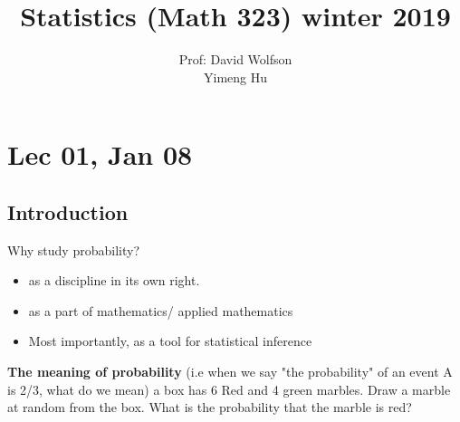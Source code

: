 \documentclass[11pt]{article}
\newcommand\tab[1][1cm]{\hspace*{#1}}
\begin{document}
\author{Prof: David Wolfson \\Yimeng Hu }
\title{Statistics (Math 323) winter 2019}
\date{}
\maketitle
\tableofcontents
\newpage
    \section{Lec 01, Jan 08}
        \subsection{Introduction}
            Why study probability? 
            \begin{itemize}
                \item as a discipline in its own right.
                \item as a part of mathematics/ applied mathematics
                \item Most importantly, as a tool for statistical inference
            \end{itemize}
            \textbf{The meaning of probability} (i.e when we say "the probability" of an event A is 2/3, what do we mean)
             a box has 6 Red and 4 green marbles. Draw a marble at random from the box.
                            What is the probability \tab that the marble is red?
\end{document}
